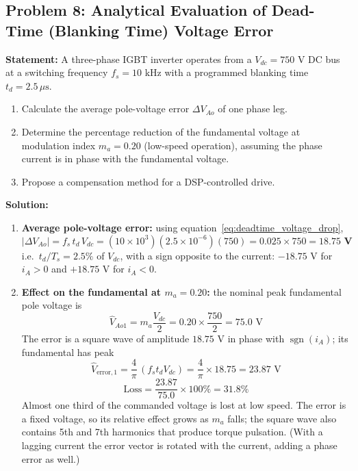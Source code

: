 \documentclass[11pt,a4paper]{article}
\let\origsubsection\subsection
\renewcommand{\subsection}{\Needspace{7\baselineskip}\origsubsection}
\begin{document}
\subsection{Problem 8: Analytical Evaluation of Dead-Time (Blanking Time) Voltage Error}
\begin{examplebox}
\textbf{Statement:} A three-phase IGBT inverter operates from a $V_{dc} = 750\text{ V}$ DC bus at a switching frequency $f_s = 10\text{ kHz}$ with a programmed blanking time $t_d = 2.5\,\mu\text{s}$.
\begin{enumerate}
  \item Calculate the average pole-voltage error $\Delta V_{Ao}$ of one phase leg.
  \item Determine the percentage reduction of the fundamental voltage at modulation index $m_a = 0.20$ (low-speed operation), assuming the phase current is in phase with the fundamental voltage.
  \item Propose a compensation method for a DSP-controlled drive.
\end{enumerate}

\tcblower
\textbf{Solution:}
\begin{enumerate}
  \item \textbf{Average pole-voltage error:} using equation~\eqref{eq:deadtime_voltage_drop},
  \begin{equation*}
  |\Delta V_{Ao}| = f_s\,t_d\,V_{dc} = (10\times 10^{3})(2.5\times 10^{-6})(750) = 0.025 \times 750 = \mathbf{18.75\text{ V}}
  \end{equation*}
  i.e.\ $t_d/T_s = 2.5\%$ of $V_{dc}$, with a sign opposite to the current: $-18.75\text{ V}$ for $i_A > 0$ and $+18.75\text{ V}$ for $i_A < 0$.

  \item \textbf{Effect on the fundamental at $m_a = 0.20$:} the nominal peak fundamental pole voltage is
  \begin{equation*}
  \hat{V}_{Ao1} = m_a\frac{V_{dc}}{2} = 0.20 \times \frac{750}{2} = 75.0\text{ V}
  \end{equation*}
  The error is a square wave of amplitude $18.75\text{ V}$ in phase with $\operatorname{sgn}(i_A)$; its fundamental has peak
  \begin{equation*}
  \hat{V}_{\text{error},1} = \frac{4}{\pi}\,(f_s t_d V_{dc}) = \frac{4}{\pi}\times 18.75 = 23.87\text{ V}
  \end{equation*}
  \begin{equation*}
  \text{Loss} = \frac{23.87}{75.0}\times 100\% = \mathbf{31.8\%}
  \end{equation*}
  Almost one third of the commanded voltage is lost at low speed. The error is a fixed voltage, so its relative effect grows as $m_a$ falls; the square wave also contains 5th and 7th harmonics that produce torque pulsation. (With a lagging current the error vector is rotated with the current, adding a phase error as well.)


\end{enumerate}
\end{examplebox}
\end{document}
